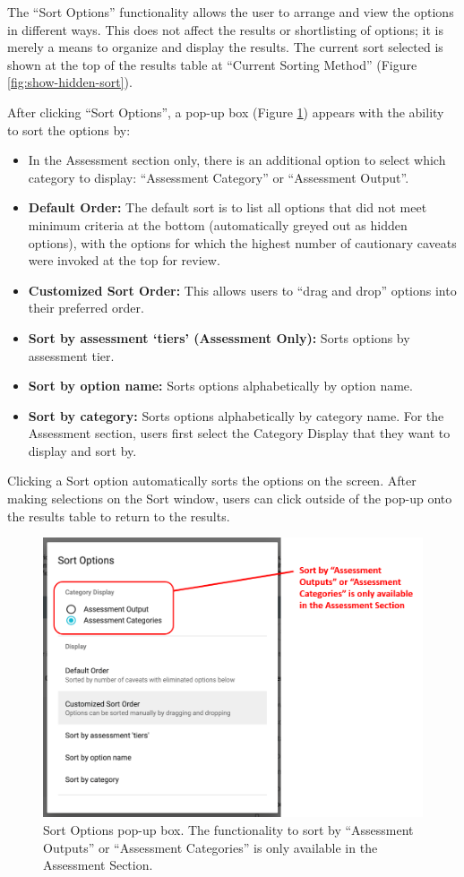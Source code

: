 \documentclass[
  11pt,
]{book}
\providecommand{\tightlist}{%
  \setlength{\itemsep}{0pt}\setlength{\parskip}{0pt}}
\begin{document}
The ``Sort Options'' functionality allows the user to arrange and view the options in different ways. This does not affect the results or shortlisting of options; it is merely a means to organize and display the results. The current sort selected is shown at the top of the results table at ``Current Sorting Method'' (Figure \ref{fig:show-hidden-sort}).

After clicking ``Sort Options'', a pop-up box (Figure \ref{fig:filter-and-sorting}) appears with the ability to sort the options by:

\begin{itemize}
\tightlist
\item
  In the Assessment section only, there is an additional option to select which category to display: ``Assessment Category'' or ``Assessment Output''.
\item
  \textbf{Default Order:} The default sort is to list all options that did not meet minimum criteria at the bottom (automatically greyed out as hidden options), with the options for which the highest number of cautionary caveats were invoked at the top for review.
\item
  \textbf{Customized Sort Order:} This allows users to ``drag and drop'' options into their preferred order.
\item
  \textbf{Sort by assessment `tiers' (Assessment Only):} Sorts options by assessment tier.
\item
  \textbf{Sort by option name:} Sorts options alphabetically by option name.
\item
  \textbf{Sort by category:} Sorts options alphabetically by category name. For the Assessment section, users first select the Category Display that they want to display and sort by.
\end{itemize}

Clicking a Sort option automatically sorts the options on the screen. After making selections on the Sort window, users can click outside of the pop-up onto the results table to return to the results.

\begin{figure}

{\centering \includegraphics[width=0.5\linewidth]{images/filter-and-sorting-assessment} 

}

\caption{Sort Options pop-up box. The functionality to sort by “Assessment Outputs” or “Assessment Categories” is only available in the Assessment Section.}\label{fig:filter-and-sorting}
\end{figure}
\end{document}
